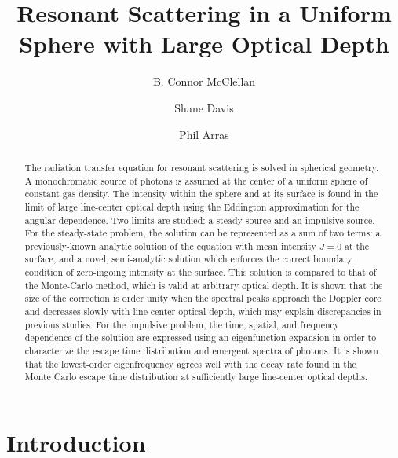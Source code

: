 \documentclass{aastex63}
\begin{document}
\title{Resonant Scattering in a Uniform Sphere with Large Optical Depth}




\author[0000-0002-6040-8281]{B. Connor McClellan}
\author[0000-0001-7488-4468]{Shane Davis}
\author[0000-0001-5611-1349]{Phil Arras}


\begin{abstract}

The radiation transfer equation for resonant scattering is solved in spherical geometry. A monochromatic source of photons is assumed at the center of a uniform sphere of constant gas density. The intensity within the sphere and at its surface is found in the limit of large line-center optical depth using the Eddington approximation for the angular dependence. Two limits are studied: a steady source and an impulsive source. For the steady-state problem, the solution can be represented as a sum of two terms: a previously-known analytic solution of the equation with  mean intensity $J=0$ at the surface, and a novel, semi-analytic solution which enforces the correct boundary condition of zero-ingoing intensity at the surface. This solution is compared to that of the Monte-Carlo method, which is valid at arbitrary optical depth. It is shown that the size of the correction is order unity when the spectral peaks approach the Doppler core and decreases slowly with line center optical depth, which may explain discrepancies in previous studies. For the impulsive problem, the time, spatial, and frequency dependence of the solution are expressed using an eigenfunction expansion in order to characterize the escape time distribution and emergent spectra of photons. It is shown that the lowest-order eigenfrequency agrees well with the decay rate found in the Monte Carlo escape time distribution at sufficiently large line-center optical depths.

\end{abstract}


\keywords{}

\section{Introduction}
\label{sec:intro}
\end{document}
